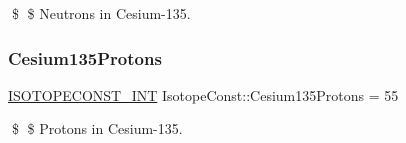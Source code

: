 \$ \$ Neutrons in Cesium-\/135. \mbox{\label{group___isotope_const-_cesium-_cs135_gae56f375f06b4cc5f98a21fa10de5e8ba}} 
\subsubsection{\texorpdfstring{Cesium135\+Protons}{Cesium135Protons}}
{\footnotesize\ttfamily \mbox{\hyperlink{group___isotope_const-_macros_ga5f18360b3e99483a35c32d789e62621c}{I\+S\+O\+T\+O\+P\+E\+C\+O\+N\+S\+T\+\_\+\+I\+NT}} Isotope\+Const\+::\+Cesium135\+Protons = 55}

\$ \$ Protons in Cesium-\/135. 